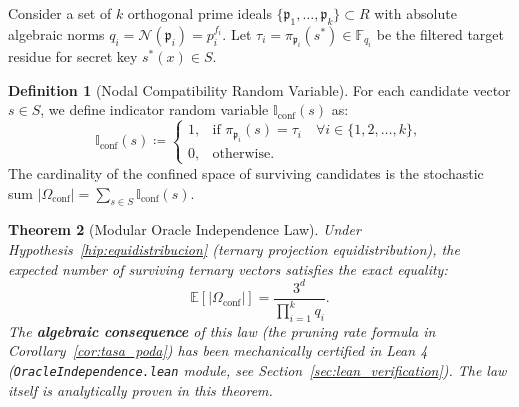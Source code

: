 \documentclass[11pt,a4paper]{article}
\theoremstyle{plain}
\newtheorem{teorema}{Theorem}[section]
\theoremstyle{definition}
\newtheorem{definicion}[teorema]{Definition}
\numberwithin{equation}{section}
\newcommand{\FF}{\mathbb{F}}
\newcommand{\cN}{\mathcal{N}}
\newcommand{\fkp}{\mathfrak{p}}
\newcommand{\E}{\mathbb{E}}
\begin{document}
Consider a set of $k$ orthogonal prime ideals $\{\fkp_1, \dots, \fkp_k\} \subset R$ with absolute algebraic norms $q_i = \cN(\fkp_i) = p_i^{f_i}$. Let $\tau_i = \pi_{\fkp_i}(s^*) \in \FF_{q_i}$ be the filtered target residue for secret key $s^*(x) \in S$.

\begin{definicion}[Nodal Compatibility Random Variable]
\label{def:variable_compatibilidad}
For each candidate vector $s \in S$, we define indicator random variable $\mathbb{I}_{\text{conf}}(s)$ as:
\begin{equation}
\mathbb{I}_{\text{conf}}(s) \coloneqq 
\begin{cases}
1, & \text{if } \pi_{\fkp_i}(s) = \tau_i \quad \forall i \in \{1, 2, \dots, k\}, \\
0, & \text{otherwise.}
\end{cases}
\end{equation}
The cardinality of the confined space of surviving candidates is the stochastic sum $|\Omega_{\text{conf}}| = \sum_{s \in S} \mathbb{I}_{\text{conf}}(s)$.
\end{definicion}

\begin{teorema}[Modular Oracle Independence Law]
\label{teo:ley_independencia_formal}
Under Hypothesis~\ref{hip:equidistribucion} (ternary projection equidistribution), the expected number of surviving ternary vectors satisfies the exact equality:
\begin{equation}
\label{eq:esperanza_ley}
\E[|\Omega_{\mathrm{conf}}|] = \frac{3^d}{\prod_{i=1}^k q_i}.
\end{equation}
The \textbf{algebraic consequence} of this law (the pruning rate formula in Corollary~\ref{cor:tasa_poda}) has been mechanically certified in Lean 4 (\texttt{OracleIndependence.lean} module, see Section~\ref{sec:lean_verification}). The law itself is analytically proven in this theorem.
\end{teorema}
\end{document}
